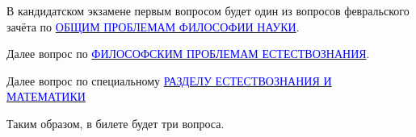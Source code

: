 \documentclass[main.tex]{subfiles}
\begin{document}

\setcounter{section}{103}

\label{sec:february-exam}

\vspace{-5pt}


\newpage

\newpage

\newpage

\newpage

\newpage

\newpage

\newpage

\newpage

\newpage

\newpage

\newpage

\newpage

\newpage

\newpage

\newpage

\newpage

\newpage

\newpage

\newpage

\newpage

\newpage

\newpage

\newpage

\newpage

\newpage

\setcounter{section}{104}

\label{sec:september-exam}

В кандидатском экзамене первым вопросом будет один из вопросов февральского зачёта по \hyperref[sec:february-exam]{\textcolor{blue}{ОБЩИМ ПРОБЛЕМАМ ФИЛОСОФИИ НАУКИ}}.

Далее вопрос по \hyperref[sec:september-exam-general]{\textcolor{blue}{ФИЛОСОФСКИМ ПРОБЛЕМАМ ЕСТЕСТВОЗНАНИЯ}}.

Далее вопрос по специальному \hyperref[sec:september-exam-physics]{\textcolor{blue}{РАЗДЕЛУ ЕСТЕСТВОЗНАНИЯ И МАТЕМАТИКИ}}

Таким образом, в билете будет три вопроса.
\newpage


\setcounter{section}{105}

\label{sec:september-exam-general}

\vspace{-5pt}
\end{document}
